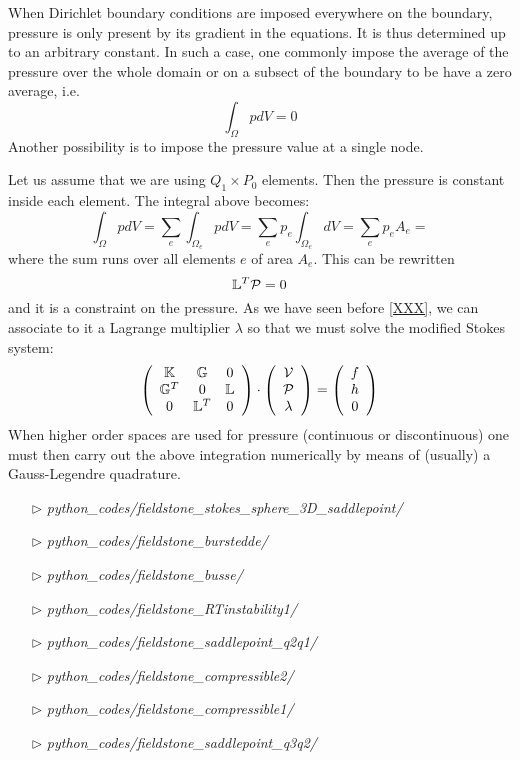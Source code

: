 When Dirichlet boundary conditions are imposed everywhere on the boundary, pressure is only present by its gradient in 
the equations. It is thus determined up to an arbitrary constant. 
In such a case, one commonly impose the average of the pressure over the whole domain or on a subsect of the boundary 
to be have a zero average, i.e.
\[
\int_\Omega p dV = 0
\]
Another possibility is to impose the pressure value at a single node. 

Let us assume that we are using $Q_1 \times P_0$ elements. Then the pressure is constant 
inside each element. 
The integral above becomes:
\[
\int_\Omega p dV = 
\sum_e  \int_{\Omega_e} p dV = 
\sum_e  p_e \int_{\Omega_e} dV = 
\sum_e  p_e A_e = 
\]
where the sum runs over all elements $e$ of area $A_e$.
This can be rewritten 
\[
{\mathbb{L}}^T {\cal P}=0
\] 
and it is a constraint on the pressure. As we have seen before \ref{XXX}, we can associate to it a 
Lagrange multiplier $\lambda$ so that we must solve the modified Stokes system:
\[
\left(
\begin{array}{ccc}
{\mathbb{K}} & {\mathbb{G}} & 0\\ 
{\mathbb{G}}^T & 0 & {\mathbb{L}} \\
0 & {\mathbb{L}}^T & 0
\end{array}
\right)
\cdot
\left(
\begin{array}{c}
{\cal V} \\ {\cal P} \\ \lambda
\end{array}
\right)
=
\left(
\begin{array}{c}
 f \\ h \\ 0
\end{array}
\right)
\]
When higher order spaces are used for pressure (continuous or discontinuous)
one must then carry out the above integration numerically by means of (usually)
a Gauss-Legendre quadrature.



\begin{mdframed}[backgroundcolor=green!5]
\begin{itemize}
\item[$\triangleright$] {\sl python\_codes/fieldstone\_stokes\_sphere\_3D\_saddlepoint/}
\item[$\triangleright$] {\sl python\_codes/fieldstone\_burstedde/}
\item[$\triangleright$] {\sl python\_codes/fieldstone\_busse/}
\item[$\triangleright$] {\sl python\_codes/fieldstone\_RTinstability1/}
\item[$\triangleright$] {\sl python\_codes/fieldstone\_saddlepoint\_q2q1/}
\item[$\triangleright$] {\sl python\_codes/fieldstone\_compressible2/}
\item[$\triangleright$] {\sl python\_codes/fieldstone\_compressible1/}
\item[$\triangleright$] {\sl python\_codes/fieldstone\_saddlepoint\_q3q2/}
\end{itemize}
\end{mdframed}





